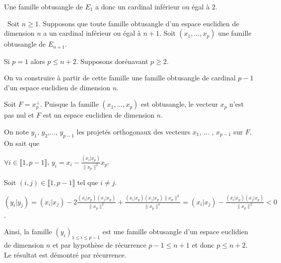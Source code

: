 {{Une famille obtusangle de $E_1$ a donc un cardinal inférieur ou égal à $2$.

\textbullet~Soit $n\geqslant1$. Supposons que toute famille obtusangle d'un espace euclidien de dimension $n$ a un cardinal inférieur ou égal à $n+1$. Soit $(x_1,...,x_p)$ une famille obtusangle de $E_{n+1}$.

Si $p = 1$ alors $p\leqslant n+2$. Supposons dorénavant $p\geqslant2$.

On va construire à partir de cette famille une famille obtusangle de cardinal $p-1$ d'un espace euclidien de dimension $n$.

Soit $F=x_p^\bot$. Puisque la famille $(x_1,...,x_p)$ est obtusangle, le vecteur $x_p$ n'est pas nul et $F$ est un espace euclidien de dimension $n$.

On note $y_1$, $y_2$,..., $y_{p-1}$ les projetés orthogonaux des vecteurs $x_1$, ... , $x_{p-1}$ sur $F$. On sait que

\begin{center}
$\forall i\in\llbracket1,p-1\rrbracket$, $y_i =x_i -\frac{\left(x_i|x_p\right)}{\|x_p\|^2}x_p$.
\end{center}

Soit $(i,j)\in\llbracket1,p-1\rrbracket$ tel que $i\neq j$.

\begin{center}
$\left(y_i|y_j\right)=\left(x_i|x_j\right)-2\frac{\left(x_i|x_p\right)\left(x_j|x_p\right)}{\|x_p\|^2}+\frac{\left(x_i|x_p\right)\left(x_j|x_p\right)\|x_p\|^2}{\|x_p\|^4}= \left(x_i|x_j\right)-\frac{\left(x_i|x_p\right)\left(x_j|x_p\right)}{\|x_p\|^2}< 0$.
\end{center}

Ainsi, la famille $(y_i)_{1\leqslant i\leqslant p-1}$ est une famille obtusangle d'un espace euclidien de dimension $n$ et par hypothèse de récurrence $p-1\leqslant n+1$ et donc $p\leqslant n+2$. Le résultat est démontré par récurrence.}
}